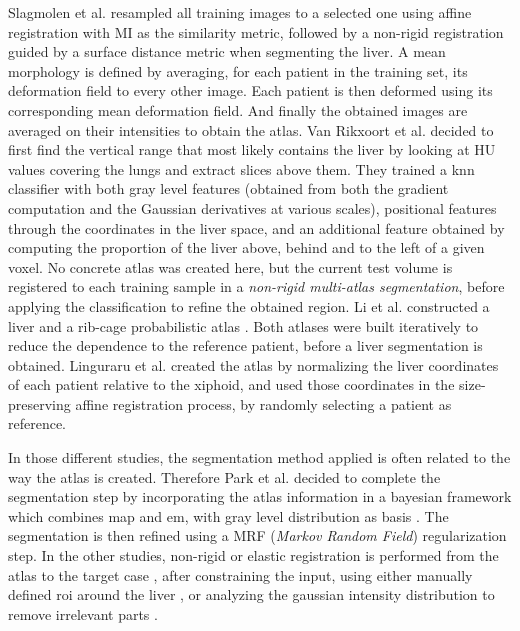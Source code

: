 Slagmolen et al. \cite{Slagmolen2007} resampled all training images to a selected one using
affine registration with MI as the similarity metric, followed by a
non-rigid registration guided by a surface distance metric when segmenting the liver. A mean
morphology is defined by averaging, for each patient in the training
set, its deformation field to every other image. Each patient is then
deformed using its corresponding mean deformation field. And finally the
obtained images are averaged on their intensities to obtain the atlas.
Van Rikxoort et al. \cite{Rikxoort2007} decided to first find the vertical range that most likely
contains the liver by looking at HU values covering the lungs and
extract slices above them. They trained a \ac{knn} classifier with both gray
level features (obtained from both the gradient computation and the
Gaussian derivatives at various scales), positional features through the
coordinates in the liver space, and an additional feature obtained by
computing the proportion of the liver above, behind and to the left of a
given voxel. No concrete atlas was created here, but the current test
volume is registered to each training sample in a \emph{non-rigid
	multi-atlas segmentation}, before applying the classification to refine
the obtained region.
Li et al. \cite{Li2010} constructed a liver and a rib-cage probabilistic atlas . Both
atlases were built iteratively to reduce the dependence to the reference
patient, before a liver segmentation is obtained. 
Linguraru et al. \cite{Linguraru2009} created the atlas by normalizing the liver coordinates of
each patient relative to the xiphoid, and used those coordinates in the
size-preserving affine registration process, by randomly selecting a
patient as reference.

In those different studies, the segmentation method applied is often
related to the way the atlas is created. Therefore Park et al. decided to complete the segmentation step by incorporating the
atlas information in a bayesian framework which combines \ac{map} and \ac{em},
with gray level distribution as basis \cite{Park2003}. The segmentation is then refined
using a MRF (\emph{Markov Random Field}) regularization step. In the
other studies, non-rigid or elastic registration is performed from the
atlas to the target case \cite{Slagmolen2007, Linguraru2009, Li2010}, after constraining the input, using either manually defined
\ac{roi} around the liver \cite{Slagmolen2007}, or analyzing the gaussian intensity distribution to
remove irrelevant parts \cite{Li2010}.


